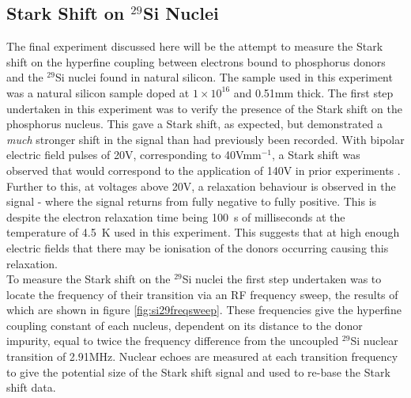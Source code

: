 \subsection{Stark Shift on $^{29}$Si Nuclei}

The final experiment discussed here will be the attempt to measure the Stark shift on the hyperfine coupling between electrons bound to phosphorus donors and the $^{29}$Si nuclei found in natural silicon.
The sample used in this experiment was a natural silicon sample doped at $1\times10^{16}$ and 0.51mm thick.
The first step undertaken in this experiment was to verify the presence of the Stark shift on the phosphorus nucleus.
This gave a Stark shift, as expected, but demonstrated a \emph{much} stronger shift in the signal than had previously been recorded. 
With bipolar electric field pulses of 20V, corresponding to 40Vmm$^{-1}$, a Stark shift was observed that would correspond to the application of 140V in prior experiments \cite{Pica2014,Wolfowicz2015a}.
Further to this, at voltages above 20V, a relaxation behaviour is observed in the signal - where the signal returns from fully negative to fully positive.
This is despite the electron relaxation time being 100~s of milliseconds at the temperature of 4.5~K used in this experiment.
This suggests that at high enough electric fields that there may be ionisation of the donors occurring causing this relaxation.
\\
To measure the Stark shift on the $^{29}$Si nuclei the first step undertaken was to locate the frequency of their transition via an RF frequency sweep, the results of which are shown in figure \ref{fig:si29freqsweep}. These frequencies give the hyperfine coupling constant of each nucleus, dependent on its distance to the donor impurity, equal to twice the frequency difference from the uncoupled $^{29}$Si nuclear transition of 2.91MHz. Nuclear echoes are measured at each transition frequency to give the potential size of the Stark shift signal and used to re-base the Stark shift data.

